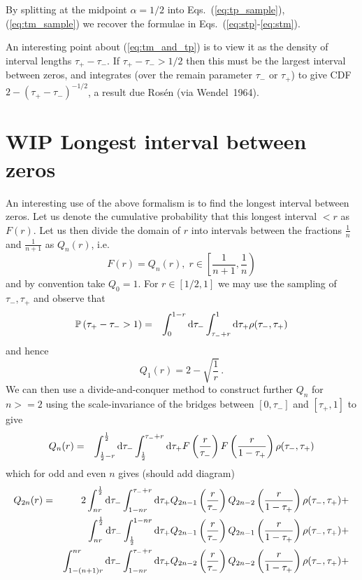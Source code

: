 \documentclass{article}
\newcommand{\tm}{{\tau_{\mathrm{-}}}}
\newcommand{\tp}{{\tau_{\mathrm{+}}}}
\begin{document}
By splitting at the midpoint $\alpha=1/2$ into Eqs.~(\ref{eq:tp_sample}),(\ref{eq:tm_sample}) we recover the formulae in Eqs.~(\ref{eq:stp}-\ref{eq:stm}).

An interesting point about (\ref{eq:tm_and_tp}) is to view it as the density of interval lengths $\tp-\tm$. If $\tp-\tm > 1/2$ then this must be the largest interval between zeros, and integrates (over the remain parameter $\tm$ or $\tp$) to give CDF $2-(\tp-\tm)^{-1/2}$, a result due Ros\'en (via Wendel~1964).

\section{WIP Longest interval between zeros}

An interesting use of the above formalism is to find the longest interval between zeros. Let us denote the cumulative probability that this longest interval $<r$ as $F(r)$. Let us then divide the domain of $r$ into intervals between the fractions $\frac{1}{n}$ and $\frac{1}{n+1}$ as $Q_n(r)$, i.e.
\begin{equation}
  F(r) = Q_n(r), \; r\in \left[ \frac{1}{n+1},\frac{1}{n}\right)
\end{equation}
and by convention take $Q_0=1$. For $r \in [1/2,1]$ we may use the sampling of $\tm, \tp$ and observe that
\begin{eqnarray}
  \mathbb{P}\left( \tp - \tm > 1 \right) &=& \int_0^{1-r} {\rm d}\tm \int_{\tm+r}^1 {\rm d}\tp \rho(\tm, \tp) \nonumber 
\end{eqnarray}
and hence
\begin{equation}
  Q_1(r) = 2 - \sqrt{\frac{1}{r}} \, . 
\end{equation}
We can then use a divide-and-conquer method to construct further $Q_n$ for $n>=2$ using the scale-invariance of the bridges between $[0,\tm]$ and $[\tp,1]$ to give
\begin{eqnarray}
  Q_{n}(r) &=& \int_{\frac{1}{2}-r}^{\frac{1}{2}} {\rm d}\tm \int_{\frac{1}{2}}^{\tm+r} {\rm d}\tp F\left(\frac{r}{\tm}\right)F\left(\frac{r}{1-\tp}\right) \rho(\tm,\tp) \nonumber 
\end{eqnarray}
which for odd and even $n$ gives (should add diagram)
\begin{eqnarray}
  Q_{2n}(r) &=& 2 \int_{nr}^{\frac{1}{2}} {\rm d}\tm \int_{1-nr}^{\tm+r} {\rm d}\tp Q_{2n-1}\left(\frac{r}{\tm}\right)Q_{2n-2}\left(\frac{r}{1-\tp}\right)\rho(\tm,\tp) + \nonumber \\
  && \int_{nr}^{\frac{1}{2}} {\rm d}\tm \int_{\frac{1}{2}}^{1-nr} {\rm d}\tp Q_{2n-1}\left(\frac{r}{\tm}\right)Q_{2n-1}\left(\frac{r}{1-\tp}\right)\rho(\tm,\tp) + \nonumber \\
  && \int_{1-(n+1)r}^{nr} {\rm d}\tm \int_{1-nr}^{\tm+r} {\rm d}\tp Q_{2n-2}\left(\frac{r}{\tm}\right)Q_{2n-2}\left(\frac{r}{1-\tp}\right)\rho(\tm,\tp) + \nonumber \\
\end{eqnarray}
\end{document}
